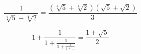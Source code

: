 \documentclass{article}
\begin{document}
$$\frac{1}{\sqrt[4]{5}-\sqrt[4]{2}} = \frac{(\sqrt[4]{5}+\sqrt[4]{2})(\sqrt{5}+\sqrt{2})}{3}$$

$$ 1+ \frac{1}{1+ \frac{1}{1+\frac{1}{1+...}}} = \frac{1+\sqrt{5}}{2}$$
\end{document}
